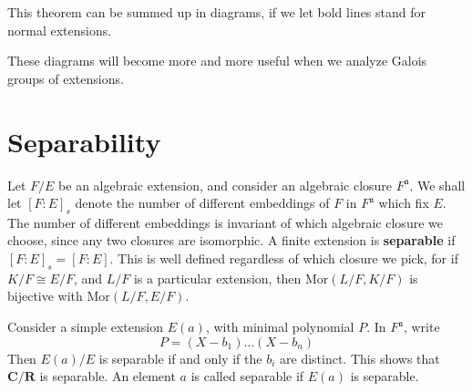 This theorem can be summed up in diagrams, if we let bold lines stand for normal extensions.
%
\begin{center}
\end{center}
%
These diagrams will become more and more useful when we analyze Galois groups of extensions.









\section{Separability}

Let $F/E$ be an algebraic extension, and consider an algebraic closure $F^{\mathfrak{a}}$. We shall let $[F:E]_s$ denote the number of different embeddings of $F$ in $F^{\mathfrak{a}}$ which fix $E$. The number of different embeddings is invariant of which algebraic closure we choose, since any two closures are isomorphic. A finite extension is {\bf separable} if $[F:E]_s = [F:E]$. This is well defined regardless of which closure we pick, for if $K/F \cong E/F$, and $L/F$ is a particular extension, then $\text{Mor}(L/F,K/F)$ is bijective with $\text{Mor}(L/F,E/F)$.

\begin{example}
    Consider a simple extension $E(a)$, with minimal polynomial $P$. In $F^{\mathfrak{a}}$, write
    \[ P = (X - b_1) \dots (X - b_n) \]
    Then $E(a)/E$ is separable if and only if the $b_i$ are distinct. This shows that $\mathbf{C}/\mathbf{R}$ is separable. An element $a$ is called separable if $E(a)$ is separable.
\end{example}

